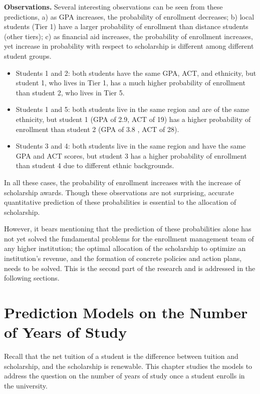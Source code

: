 \documentclass[12pt,english]{report}
\begin{document}
\vspace{0.15in}
\noindent \textbf{Observations.} Several interesting observations can be seen from these predictions, a) as GPA  increases, the probability of enrollment decreases; b) local students (Tier 1)  have a larger probability of enrollment than distance students (other tiers);  c) as financial aid increases, the probability of enrollment increases, yet  increase in probability with respect to scholarship is different among  different student groups.

\begin{itemize}
\item	Students 1 and 2: both students have the same GPA, ACT, and ethnicity, but student 1, who lives in Tier 1, has a much higher probability of enrollment than student 2, who lives in Tier 5.
\item Students 1 and 5: both students live in the same region and are of the same ethnicity, but student 1 (GPA of 2.9, ACT of 19) has a higher probability of enrollment than student 2 (GPA of 3.8 , ACT of 28).
\item Students 3 and 4: both students live in the same region and have the same GPA and ACT scores, but student 3 has a higher probability of enrollment than student 4 due to different ethnic backgrounds.
\end{itemize}

In all these cases, the probability of enrollment increases with the increase of scholarship awards. Though these observations are not surprising, accurate  quantitative prediction of these probabilities is essential to the allocation  of scholarship.

However, it  bears mentioning that the prediction of these probabilities alone  has not yet solved the fundamental problems for the enrollment management team  of any higher institution;  the optimal allocation of the scholarship to  optimize an institution's revenue, and the formation of concrete policies and  action plans,  needs to be solved. This is the second part of the research and  is addressed in the following sections.


\chapter {Prediction Models on the Number of Years of Study}
Recall that the net tuition of a student is the difference between tuition and scholarship, and the scholarship is renewable. This chapter studies the models to address the question on the number of years of study once a student enrolls in the university. 
% 
% 
\end{document}
